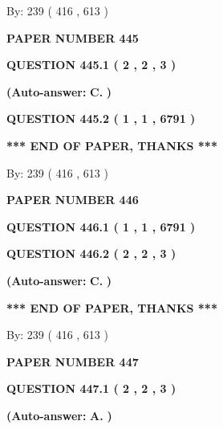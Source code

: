 \documentclass[12pt]{article}
\begin{document}
   
\hspace{1.0in} By: 
 239 ( 416 ,  613 )
   
   
   
   
\newpage 
\setcounter{page}{ 
   445001 } 
   
   
 {\textbf{ \Large{ PAPER NUMBER  445  }}}
   
   
   
   
  
  
{\textbf{\large{QUESTION
445.1 
 ( 2 , 2 , 3 )
}}}
 
 
{\textbf{(Auto-answer:}}
{\textbf{\large{
C.}}}
{\textbf{)}}
 
 
  
  
{\textbf{\large{QUESTION
445.2 
 ( 1 , 1 , 6791 )
}}}
   
   
   
   
\vspace{1.0in} 
{\textbf{\large{ *** END OF PAPER, THANKS *** }}} 
   
   
\hspace{1.0in} By: 
 239 ( 416 ,  613 )
   
   
   
   
\newpage 
\setcounter{page}{ 
   446001 } 
   
   
 {\textbf{ \Large{ PAPER NUMBER  446  }}}
   
   
   
   
  
  
{\textbf{\large{QUESTION
446.1 
 ( 1 , 1 , 6791 )
}}}
  
  
{\textbf{\large{QUESTION
446.2 
 ( 2 , 2 , 3 )
}}}
 
 
{\textbf{(Auto-answer:}}
{\textbf{\large{
C.}}}
{\textbf{)}}
 
 
   
   
   
   
\vspace{1.0in} 
{\textbf{\large{ *** END OF PAPER, THANKS *** }}} 
   
   
\hspace{1.0in} By: 
 239 ( 416 ,  613 )
   
   
   
   
\newpage 
\setcounter{page}{ 
   447001 } 
   
   
 {\textbf{ \Large{ PAPER NUMBER  447  }}}
   
   
   
   
  
  
{\textbf{\large{QUESTION
447.1 
 ( 2 , 2 , 3 )
}}}
 
 
{\textbf{(Auto-answer:}}
{\textbf{\large{
A.}}}
{\textbf{)}}
 
\end{document}
